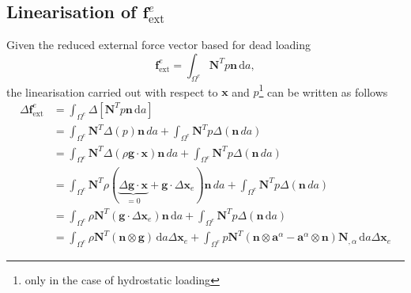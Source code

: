 \subsection{Linearisation of \texorpdfstring{$\mathbf{f}_{\text{ext}}^{e}$}{External Force Vector}}
Given the reduced external force vector based for dead loading 
\begin{equation}
    \mathbf{f}_{\mathrm{ext}}^{e} = \int_{\Omega^{e}} \mathbf{N}^{T} p \boldsymbol{n} \, \mathrm{d} a,
\end{equation}
the linearisation carried out with respect to $\mathbf{x}$ and $p$\footnote{only in the case of hydrostatic loading} can be written as follows
    \begin{equation}\label{eq:del_f_ext_dead_2}
        \begin{split}
            \Delta \mathbf{f}_{\mathrm{ext}}^{e} &= \int_{\Omega^{e}} \Delta \left[\mathbf{N}^{T} p \boldsymbol{n} \, \mathrm{d} a\right]\\
            &= \int_{\Omega^{e}} \mathbf{N}^{T} \Delta \left(p\right) \boldsymbol{n} \,d a + \int_{\Omega^{e}}\mathbf{N}^{T} p \Delta\left(\boldsymbol{n}\,da\right)\\
            &= \int_{\Omega^{e}} \mathbf{N}^{T} \Delta \left(\rho \mathbf{g} \cdot \boldsymbol{x}\right) \boldsymbol{n}\,da + \int_{\Omega^{e}} \mathbf{N}^{T} p \Delta\left(\boldsymbol{n}\,da\right)\\
            &= \int_{\Omega^{e}} \mathbf{N}^{T} \rho \left(\underbrace{\Delta \mathbf{g} \cdot \boldsymbol{x}}_{=0} + \mathbf{g} \cdot \Delta \mathbf{x}_{e}\right) \boldsymbol{n}\,da + \int_{\Omega^{e}} \mathbf{N}^{T} p \Delta\left(\boldsymbol{n}\,da\right)\\
            &= \int_{\Omega^{e}} \rho \mathbf{N}^{T} \left( \boldsymbol{g} \cdot \Delta \mathbf{x}_{e} \right) \boldsymbol{n} \, \mathrm{d} a + \int_{\Omega^{e}} \mathbf{N}^{T} p \Delta \left( \boldsymbol{n} \, \mathrm{d} a \right) \\ &= \int_{\Omega^{e}} \rho \mathbf{N}^{T} \left( \boldsymbol{n} \otimes \boldsymbol{g} \right) \, \mathrm{d} a \Delta \mathbf{x}_{e} + \int_{\Omega^{e}} p \mathbf{N}^{T} \left( \boldsymbol{n} \otimes \boldsymbol{a}^{\alpha} - \boldsymbol{a}^{\alpha} \otimes \boldsymbol{n} \right) \mathbf{N}_{, \alpha} \, \mathrm{d} a \Delta \mathbf{x}_{e}
        \end{split}
    \end{equation}

\afterpage{\blankpage}